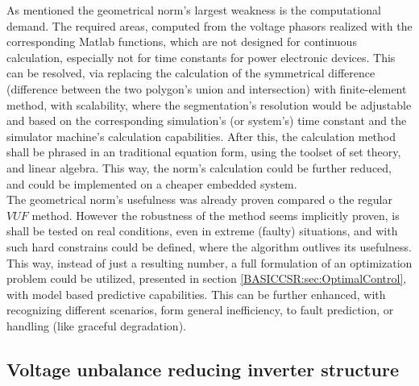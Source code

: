 		As mentioned the geometrical norm's largest weakness is the computational demand. The required areas, computed from the voltage phasors realized with the corresponding Matlab functions, which are not designed for continuous calculation, especially not for time constants for power electronic devices. This can be resolved, via replacing the calculation of the symmetrical difference (difference between the two polygon's union and intersection) with finite-element method, with scalability, where the segmentation's resolution would be adjustable and based on the corresponding simulation's (or system's) time constant and the simulator machine's calculation capabilities. After this, the calculation method shall be phrased in an traditional equation form, using the toolset of set theory, and linear algebra. This way, the norm's calculation could be further reduced, and could be implemented on a cheaper embedded system.\\
		The geometrical norm's usefulness was already proven compared o the regular $VUF$ method. However the robustness of the method seems implicitly proven, is shall be tested on real conditions, even in extreme (faulty) situations, and with such hard constrains could be defined, where the algorithm outlives its usefulness. This way, instead of just a resulting number, a full formulation of an optimization problem could be utilized, presented in section \ref{BASICCSR:sec:OptimalControl}, with model based predictive capabilities. This can be further enhanced, with recognizing different scenarios, form general inefficiency, to fault prediction, or handling (like graceful degradation).
		
		\subsection{Voltage unbalance reducing inverter structure}
		
